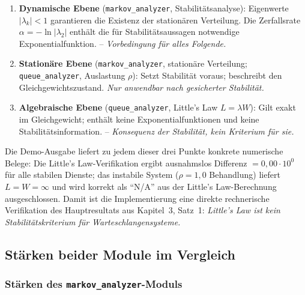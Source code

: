 ﻿\documentclass[a4paper,12pt]{scrreprt}
\theoremstyle{definition}
\begin{document}
\begin{enumerate}
	\item[-] \textbf{Dynamische Ebene} (\texttt{markov\_analyzer},
	Stabilitätsanalyse): Eigenwerte $|\lambda_k| < 1$ garantieren
	die Existenz der stationären Verteilung. Die Zerfallsrate
	$\alpha = -\ln|\lambda_2|$ enthält die für Stabilitätsaussagen
	notwendige Exponentialfunktion. -- \emph{Vorbedingung für alles Folgende.}
	
	\item[-] \textbf{Stationäre Ebene} (\texttt{markov\_analyzer},
	stationäre Verteilung; \texttt{queue\_analyzer}, Auslastung $\rho$):
	Setzt Stabilität voraus; beschreibt den Gleichgewichtszustand.
	\emph{Nur anwendbar nach gesicherter Stabilität.}
	
	\item[-] \textbf{Algebraische Ebene} (\texttt{queue\_analyzer},
	Little's Law $L = \lambda W$): Gilt exakt im Gleichgewicht;
	enthält keine Exponentialfunktionen und keine Stabilitätsinformation.
	-- \emph{Konsequenz der Stabilität, kein Kriterium für sie.}
\end{enumerate}

Die Demo-Ausgabe liefert zu jedem dieser drei Punkte konkrete numerische
Belege: Die Little's Law-Verifikation ergibt ausnahmslos Differenz
$= 0{,}00 \cdot 10^0$ für alle stabilen Dienste; das instabile System
($\rho = 1{,}0$ Behandlung) liefert $L = W = \infty$ und wird korrekt
als ``N/A'' aus der Little's Law-Berechnung ausgeschlossen.
Damit ist die Implementierung eine direkte rechnerische Verifikation
des Hauptresultats aus Kapitel~3, Satz~1: \emph{Little's Law
	ist kein Stabilitätskriterium für Warteschlangensysteme.}

\subsection{Stärken beider Module im Vergleich}
\label{sec:module-staerken}

\subsubsection{Stärken des \texttt{markov\_analyzer}-Moduls}
\end{document}
